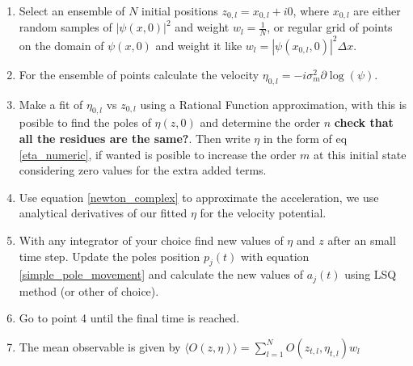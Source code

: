 \documentclass[a4paper,12pt]{article}
\begin{document}
\begin{enumerate}
\item Select an ensemble of $N$ initial positions $z_{0,l} = x_{0,l} + i0$, where $x_{0,l}$ are either random samples of $|\psi(x,0)|^2$ and weight $w_l=\frac{1}{N}$, or regular grid of points on the domain of $\psi(x,0)$ and weight it like $w_l= |\psi(x_{0,l},0)|^2 \Delta x$.
\item For the ensemble of points calculate the velocity $\eta_{0,l} = -i \sigma_m^2 \partial \log(\psi)$.
\item Make a fit of $\eta_{0,l}$ vs $z_{0,l}$ using a Rational Function approximation, with this is posible to find the poles of $\eta(z,0)$
and determine the order $n$ {\bf check that all the residues are the same?}. Then write $\eta$ in the form of eq \ref{eta_numeric},
 if wanted is posible to increase the order $m$ at this initial state considering zero values for the extra added terms.
\item Use equation \ref{newton_complex} to approximate the acceleration, we use analytical derivatives of our fitted $\eta$ for the
velocity potential.
\item With any integrator of your choice find new values of $\eta$ and $z$ after an small time step. Update the poles position $p_j(t)$ with equation \ref{simple_pole_movement} and calculate the new values of $a_j(t)$  using LSQ method (or other of choice).
\item Go to point 4 until the final time is reached.
\item  The mean observable is given by $\langle O(z,\eta) \rangle = \sum_{l=1}^{N} O(z_{t,l}, \eta_{t,l}) w_l$ 
\end{enumerate}






\printbibliography
\end{document}
